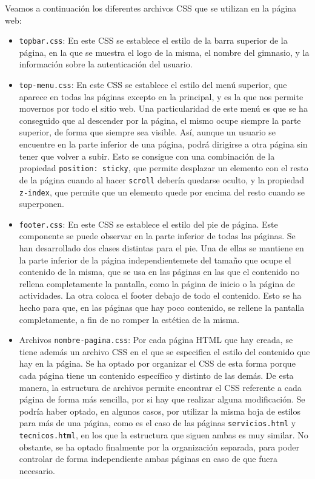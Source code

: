 \documentclass[11pt]{article}
\theoremstyle{plain}
\theoremstyle{definition}
\begin{document}
Veamos a continuación los diferentes archivos CSS que se utilizan en
la página web:

\begin{itemize}
\item \texttt{topbar.css}: En este CSS se establece el estilo de la
  barra superior de la página, en la que se muestra el logo de la
  misma, el nombre del gimnasio, y la información sobre la
  autenticación del usuario.
\item \texttt{top-menu.css}: En este CSS se establece el estilo del
  menú superior, que aparece en todas las páginas excepto en la
  principal, y es la que nos permite movernos por todo el sitio
  web. Una particularidad de este menú es que se ha conseguido que al
  descender por la página, el mismo ocupe siempre la parte superior,
  de forma que siempre sea visible.  Así, aunque un usuario se
  encuentre en la parte inferior de una página, podrá dirigirse a otra
  página sin tener que volver a subir. Esto se consigue con una
  combinación de la propiedad \texttt{position: sticky}, que permite
  desplazar un elemento con el resto de la página cuando al hacer
  \texttt{scroll} debería quedarse oculto, y la propiedad
  \texttt{z-index}, que permite que un elemento quede por encima del
  resto cuando se superponen.
\item \texttt{footer.css}: En este CSS se establece el estilo del pie
  de página. Este componente se puede observar en la parte inferior de
  todas las páginas. Se han desarrollado dos clases distintas para el
  pie. Una de ellas se mantiene en la parte inferior de la página
  independientemete del tamaño que ocupe el contenido de la misma, que
  se usa en las páginas en las que el contenido no rellena
  completamente la pantalla, como la página de inicio o la página de
  actividades. La otra coloca el footer debajo de todo el
  contenido. Esto se ha hecho para que, en las páginas que hay poco
  contenido, se rellene la pantalla completamente, a fin de no romper
  la estética de la misma.
\item Archivos \texttt{nombre-pagina.css}: Por cada página HTML que
  hay creada, se tiene además un archivo CSS en el que se especifica
  el estilo del contenido que hay en la página. Se ha optado por
  organizar el CSS de esta forma porque cada página tiene un contenido
  específico y distinto de las demás. De esta manera, la estructura de
  archivos permite encontrar el CSS referente a cada página de forma
  más sencilla, por si hay que realizar alguna modificación. Se podría
  haber optado, en algunos casos, por utilizar la misma hoja de
  estilos para más de una página, como es el caso de las páginas
  \texttt{servicios.html} y \texttt{tecnicos.html}, en los que la
  estructura que siguen ambas es muy similar. No obstante, se ha
  optado finalmente por la organización separada, para poder controlar
  de forma independiente ambas páginas en caso de que fuera necesario.
\end{itemize}
\end{document}
